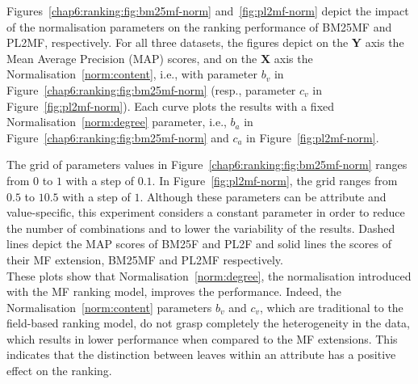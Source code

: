 Figures~\ref{chap6:ranking:fig:bm25mf-norm} and~\ref{fig:pl2mf-norm} depict the impact of the normalisation parameters on the ranking performance of \gls{BM25MF} and \gls{PL2MF}, respectively. For all three datasets, the figures depict on the \textbf{Y} axis the Mean Average Precision (MAP) scores, and on the \textbf{X} axis the Normalisation~\ref{norm:content}, i.e., with parameter $b_v$ in Figure~\ref{chap6:ranking:fig:bm25mf-norm} (resp., parameter $c_v$ in Figure~\ref{fig:pl2mf-norm}). Each curve plots the results with a fixed Normalisation~\ref{norm:degree} parameter, i.e., $b_a$ in Figure~\ref{chap6:ranking:fig:bm25mf-norm} and $c_a$ in Figure~\ref{fig:pl2mf-norm}.

The grid of parameters values in Figure~\ref{chap6:ranking:fig:bm25mf-norm} ranges from $0$ to $1$ with a step of $0.1$. In Figure~\ref{fig:pl2mf-norm}, the grid ranges from $0.5$ to $10.5$ with a step of $1$. Although these parameters can be attribute and value-specific, this experiment considers a constant parameter in order to reduce the number of combinations and to lower the variability of the results. Dashed lines depict the MAP scores of BM25F and PL2F and solid lines the scores of their \gls{MF} extension, \gls{BM25MF} and \gls{PL2MF} respectively.\\

These plots show that Normalisation~\ref{norm:degree}, the normalisation introduced with the \gls{MF} ranking model, improves the performance. Indeed, the Normalisation~\ref{norm:content} parameters $b_v$ and $c_v$, which are traditional to the field-based ranking model, do not grasp completely the heterogeneity in the data, which results in lower performance when compared to the \gls{MF} extensions. This indicates that the distinction between leaves within an attribute has a positive effect on the ranking.

